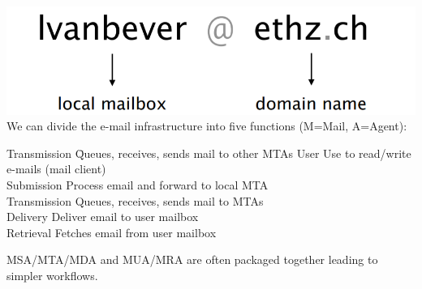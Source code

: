 \documentclass[a4paper, fontsize=8pt, landscape, DIV=1]{scrartcl}
\begin{document}
\begin{multicols*}{4}
		\includegraphics[width=\columnwidth]{images/Application_Layer/email_identify.png}
		We can divide the e-mail infrastructure into five functions (M=Mail, A=Agent):
		
		\begin{tabbing}
			Transmission \=  Queues, receives, sends mail to other MTAs \kill
			User\> Use to read/write e-mails (mail client)\\
			Submission \> Process email and forward to local MTA\\
			Transmission \> Queues, receives, sends mail to MTAs\\
			Delivery \> Deliver email to user mailbox\\
			Retrieval \> Fetches email from user mailbox
		\end{tabbing}
		MSA/MTA/MDA and MUA/MRA are often packaged together leading to simpler
		workflows.\\
		

\end{multicols*}
\end{document}

